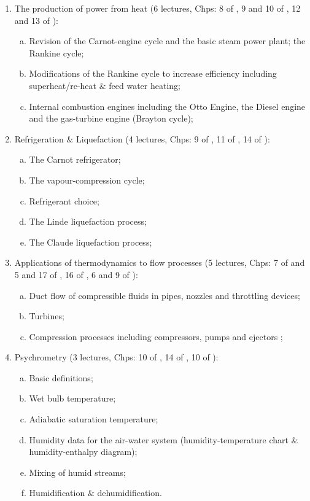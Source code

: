 \documentclass[11pt,oneside,a4paper]{article}
\begin{document}
\begin{enumerate}[{\bf Module 1:}]
\item The production of power from heat (6 lectures, Chps: 8 of \cite{smith_2001}, 9 and 10 of \cite{cengel_2010}, 12 and 13 of \cite{rajput_2007}): 
\begin{enumerate}[(a)]
\item Revision of the Carnot-engine cycle and the basic steam power plant; the Rankine cycle; 
\item Modifications of the Rankine cycle to increase efficiency including superheat/re-heat $\&$ feed water heating; 
\item Internal combustion engines including the Otto Engine, the Diesel engine and the gas-turbine engine (Brayton cycle); 
\end{enumerate}
%
\item Refrigeration $\&$ Liquefaction (4 lectures, Chps: 9 of \cite{smith_2001}, 11 of \cite{cengel_2010}, 14 of \cite{rajput_2007}):
\begin{enumerate}[(a)]
\item The Carnot refrigerator; 
\item The vapour-compression cycle; 
\item Refrigerant choice; 
\item The Linde liquefaction process; 
\item The Claude liquefaction process;
\end{enumerate}
%
\item Applications of thermodynamics to flow processes (5 lectures, Chps: 7 of \cite{smith_2001} and 5 and 17 of \cite{cengel_2010}, 16 of \cite{rajput_2007}, 6 and 9 of \cite{powers_2012}): 
\begin{enumerate}[(a)]
\item Duct flow of compressible fluids in pipes, nozzles and throttling devices; 
\item Turbines; 
\item Compression processes including compressors, pumps and ejectors ;
\end{enumerate}
%
\item Psychrometry (3 lectures, Chps: 10 of \cite{muller_2009}, 14 of \cite{cengel_2010}, 10 of \cite{rajput_2007}): 
\begin{enumerate}[(a)]
\item Basic definitions; 
\item Wet bulb temperature; 
\item Adiabatic saturation temperature; 
\item Humidity data for the air-water system (humidity-temperature chart $\&$ humidity-enthalpy diagram); 
\item Mixing of humid streams; 
\item Humidification $\&$ dehumidification.
\end{enumerate}

\end{enumerate}
\end{document}
